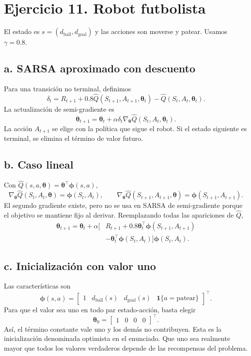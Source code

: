\documentclass[11pt,a4paper]{article}
\newcommand{\indic}{\mathbf{1}}
\newcommand{\apartado}[1]{\subsection*{#1}}
\begin{document}
\section{Ejercicio 11. Robot futbolista}

El estado es $s=(d_{\mathrm{ball}},d_{\mathrm{goal}})$ y las acciones son moverse y patear. Usamos $\gamma=0.8$.

\apartado{a. SARSA aproximado con descuento}
Para una transición no terminal, definimos
\[
\delta_t=R_{t+1}+0.8\widehat Q(S_{t+1},A_{t+1},\boldsymbol\theta_t)
-\widehat Q(S_t,A_t,\boldsymbol\theta_t).
\]
La actualización de semi-gradiente es
\[
\boxed{\boldsymbol\theta_{t+1}=\boldsymbol\theta_t+
\alpha\delta_t\nabla_{\boldsymbol\theta}\widehat Q(S_t,A_t,\boldsymbol\theta_t).}
\]
La acción $A_{t+1}$ se elige con la política que sigue el robot. Si el estado siguiente es terminal, se elimina el término de valor futuro.

\apartado{b. Caso lineal}
Con $\widehat Q(s,a,\boldsymbol\theta)=\boldsymbol\theta^\top\boldsymbol\phi(s,a)$,
\[
\nabla_{\boldsymbol\theta}\widehat Q(S_t,A_t,\boldsymbol\theta)
=\boldsymbol\phi(S_t,A_t),\qquad
\nabla_{\boldsymbol\theta}\widehat Q(S_{t+1},A_{t+1},\boldsymbol\theta)
=\boldsymbol\phi(S_{t+1},A_{t+1}).
\]
El segundo gradiente existe, pero no se usa en SARSA de semi-gradiente porque el objetivo se mantiene fijo al derivar. Reemplazando todas las apariciones de $\widehat Q$,
\[
\boxed{\begin{aligned}
\boldsymbol\theta_{t+1}=\boldsymbol\theta_t+\alpha
\big[&R_{t+1}+0.8\boldsymbol\theta_t^\top\boldsymbol\phi(S_{t+1},A_{t+1})\\
&-\boldsymbol\theta_t^\top\boldsymbol\phi(S_t,A_t)\big]\boldsymbol\phi(S_t,A_t).
\end{aligned}}
\]

\apartado{c. Inicialización con valor uno}
Las características son
\[
\boldsymbol\phi(s,a)=\begin{bmatrix}1&d_{\mathrm{ball}}(s)&d_{\mathrm{goal}}(s)&\indic\{a=\text{patear}\}\end{bmatrix}^{\top}.
\]
Para que el valor sea uno en todo par estado-acción, basta elegir
\[
\boxed{\boldsymbol\theta_0=\begin{bmatrix}1&0&0&0\end{bmatrix}^{\top}.}
\]
Así, el término constante vale uno y los demás no contribuyen. Esta es la inicialización denominada optimista en el enunciado. Que uno sea realmente mayor que todos los valores verdaderos depende de las recompensas del problema.
\end{document}
